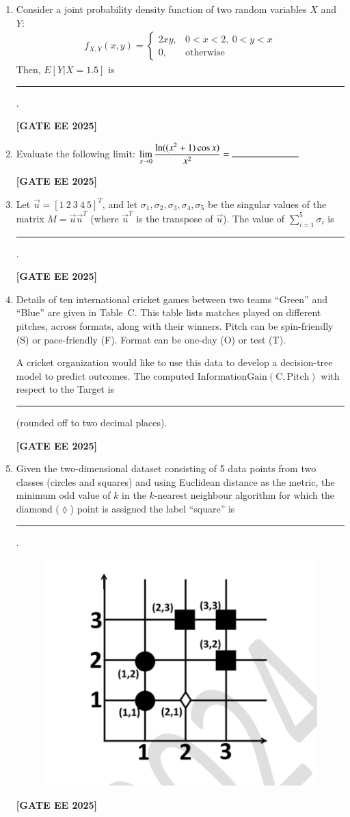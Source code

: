\documentclass[journal]{IEEEtran}
\newcommand{\qfooter}{%
  \begin{flushright}\footnotesize\textbf{[GATE EE 2025]}\end{flushright}\vspace{1em}%
}
\begin{document}
\begin{enumerate}
\item Consider a joint probability density function of two random variables $X$ and $Y$:
\begin{align}
f_{X,Y}(x, y) = \begin{cases}
2xy,& 0 < x < 2,\ 0 < y < x\\
0,& \text{otherwise}
\end{cases}
\end{align}
Then, $E[Y|X=1.5]$ is \rule{7em}{0.07em}.
\qfooter

\item Evaluate the following limit:
$\displaystyle \lim_{x\to 0} \frac{\ln((x^2+1)\cos x)}{x^2} = \rule{7em}{0.07em}$
\qfooter



\item Let $\vec{u} = [1\ 2\ 3\ 4\ 5]^T$, and let $\sigma_1, \sigma_2, \sigma_3, \sigma_4, \sigma_5$ be the singular values of the matrix $M = \vec{u} \vec{u}^T$ (where $\vec{u}^T$ is the transpose of $\vec{u}$). The value of $\sum\limits_{i=1}^{5} \sigma_i$ is \rule{7em}{0.07em}.
\qfooter

\item Details of ten international cricket games between two teams “Green” and “Blue” are given in Table~C. 
This table lists matches played on different pitches, across formats, along with their winners.  
Pitch can be spin-friendly (S) or pace-friendly (F).  
Format can be one-day (O) or test (T).

A cricket organization would like to use this data to develop a decision-tree model to predict outcomes.  
The computed $\mathrm{InformationGain}(\mathrm{C}, \mathrm{Pitch})$ with respect to the Target is \rule{2cm}{0.15mm} (rounded off to two decimal places).

\qfooter

\item Given the two-dimensional dataset consisting of 5 data points from two classes (circles and squares)  
and using Euclidean distance as the metric, the minimum odd value of $k$ in the $k$-nearest neighbour algorithm  
for which the diamond ($\lozenge$) point is assigned the label ``square'' is \rule{2cm}{0.15mm}.

\begin{figure}[H]
\centering
\includegraphics[width=0.45\columnwidth]{figs/63.png} %
\label{fig:63}
\end{figure}
\qfooter



\end{enumerate}
\end{document}
